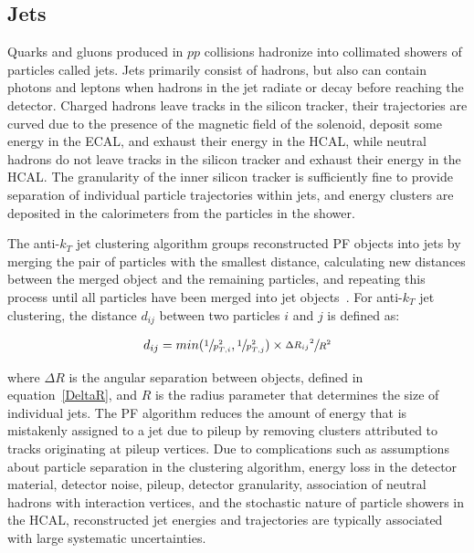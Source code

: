 \subsection{Jets}
\label{PF_Reconstruction_Jets}
Quarks and gluons produced in $pp$ collisions hadronize into collimated showers of particles called jets.
Jets primarily consist of hadrons, but also can contain photons and leptons when hadrons in the jet radiate or decay before reaching the detector.
Charged hadrons leave tracks in the silicon tracker, their trajectories are curved due to the presence of the magnetic field of the solenoid, deposit some energy in the ECAL, and exhaust their energy in the HCAL, while neutral hadrons do not leave tracks in the silicon tracker and exhaust their energy in the HCAL.
The granularity of the inner silicon tracker is sufficiently fine to provide separation of individual particle trajectories within jets, and energy clusters are deposited in the calorimeters from the particles in the shower.

The anti-$k_T$ jet clustering algorithm groups reconstructed PF objects into jets by merging the pair of particles with the smallest distance, calculating new distances between the merged object and the remaining particles, and repeating this process until all particles have been merged into jet objects~\cite{Matteo_Cacciari_2008}.
For anti-$k_T$ jet clustering, the distance $d_{ij}$ between two particles $i$ and $j$ is defined as:
\begin{linenomath*}
\begin{align}
d_{ij} = min(\sfrac{1}{p_{T,i}^2}, \sfrac{1}{p_{T,j}^2}) \times \sfrac{{\Delta R_{ij}}^2}{R^2}
\end{align}
\end{linenomath*}
where $\Delta R$ is the angular separation between objects, defined in equation~\ref{DeltaR}, and $R$ is the radius parameter that determines the size of individual jets.
The PF algorithm reduces the amount of energy that is mistakenly assigned to a jet due to pileup by removing clusters attributed to tracks originating at pileup vertices.
Due to complications such as assumptions about particle separation in the clustering algorithm, energy loss in the detector material, detector noise, pileup, detector granularity, association of neutral hadrons with interaction vertices, and the stochastic nature of particle showers in the HCAL, reconstructed jet energies and trajectories are typically associated with large systematic uncertainties.

